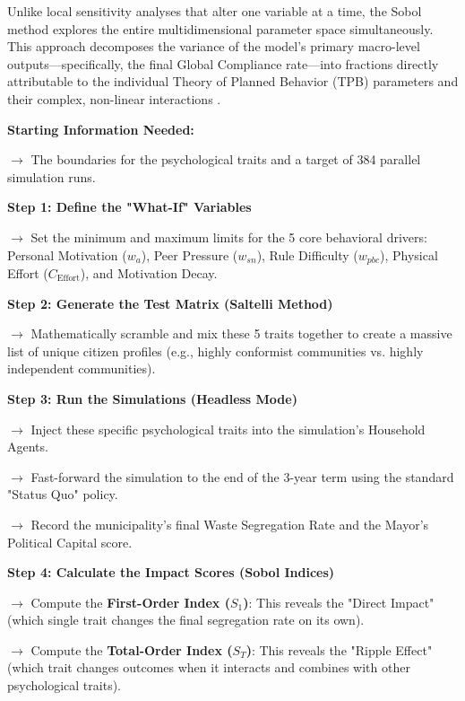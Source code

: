 Unlike local sensitivity analyses that alter one variable at a time, the Sobol method explores the entire multidimensional parameter space simultaneously. This approach decomposes the variance of the model's primary macro-level outputs—specifically, the final Global Compliance rate—into fractions directly attributable to the individual Theory of Planned Behavior (TPB) parameters and their complex, non-linear interactions \citep{ZhengAI2022}. 

\begin{algorithm}[H]
\caption{Global Sensitivity Analysis (Stress-Testing the Simulation)}
\label{alg:sobol_gsa_english}
\begin{algorithmic}[1]
\State \textbf{Starting Information Needed:} 
\State \parbox[t]{0.9\linewidth}{$\rightarrow$ The boundaries for the psychological traits and a target of 384 parallel simulation runs.\strut}
\Statex
\State \textbf{Step 1: Define the "What-If" Variables}
\State \parbox[t]{0.9\linewidth}{$\rightarrow$ Set the minimum and maximum limits for the 5 core behavioral drivers: Personal Motivation ($w_a$), Peer Pressure ($w_{sn}$), Rule Difficulty ($w_{pbc}$), Physical Effort ($C_{\mathrm{Effort}}$), and Motivation Decay.\strut}
\Statex
\State \textbf{Step 2: Generate the Test Matrix (Saltelli Method)}
\State \parbox[t]{0.9\linewidth}{$\rightarrow$ Mathematically scramble and mix these 5 traits together to create a massive list of unique citizen profiles (e.g., highly conformist communities vs. highly independent communities).\strut}
\Statex
\State \textbf{Step 3: Run the Simulations (Headless Mode)}
    \State \parbox[t]{0.88\linewidth}{$\rightarrow$ Inject these specific psychological traits into the simulation's Household Agents.\strut}
    \State \parbox[t]{0.88\linewidth}{$\rightarrow$ Fast-forward the simulation to the end of the 3-year term using the standard "Status Quo" policy.\strut}
    \State \parbox[t]{0.88\linewidth}{$\rightarrow$ Record the municipality's final Waste Segregation Rate and the Mayor's Political Capital score.\strut}
\EndFor
\Statex
\State \textbf{Step 4: Calculate the Impact Scores (Sobol Indices)}
\State \parbox[t]{0.9\linewidth}{$\rightarrow$ Compute the \textbf{First-Order Index ($S_1$)}: This reveals the "Direct Impact" (which single trait changes the final segregation rate on its own).\strut}
\State \parbox[t]{0.9\linewidth}{$\rightarrow$ Compute the \textbf{Total-Order Index ($S_T$)}: This reveals the "Ripple Effect" (which trait changes outcomes when it interacts and combines with other psychological traits).\strut}
\end{algorithmic}
\end{algorithm}

